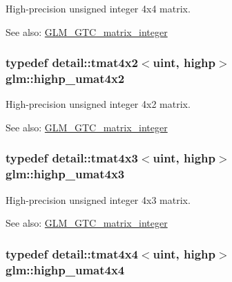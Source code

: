 High-precision unsigned integer 4x4 matrix. \begin{Desc}
\item[See also:]\hyperlink{group__gtc__matrix__integer}{GLM\_\-GTC\_\-matrix\_\-integer} \end{Desc}
\hypertarget{group__gtc__matrix__integer_g32442efcb778cb80024a17bafa781f81}{
\subsubsection[highp\_\-umat4x2]{\setlength{\rightskip}{0pt plus 5cm}typedef detail::tmat4x2$<$uint, highp$>$ {\bf glm::highp\_\-umat4x2}}}
\label{group__gtc__matrix__integer_g32442efcb778cb80024a17bafa781f81}


High-precision unsigned integer 4x2 matrix. \begin{Desc}
\item[See also:]\hyperlink{group__gtc__matrix__integer}{GLM\_\-GTC\_\-matrix\_\-integer} \end{Desc}
\hypertarget{group__gtc__matrix__integer_g763a36c57b6073ca3cac739bfbe794ba}{
\subsubsection[highp\_\-umat4x3]{\setlength{\rightskip}{0pt plus 5cm}typedef detail::tmat4x3$<$uint, highp$>$ {\bf glm::highp\_\-umat4x3}}}
\label{group__gtc__matrix__integer_g763a36c57b6073ca3cac739bfbe794ba}


High-precision unsigned integer 4x3 matrix. \begin{Desc}
\item[See also:]\hyperlink{group__gtc__matrix__integer}{GLM\_\-GTC\_\-matrix\_\-integer} \end{Desc}
\hypertarget{group__gtc__matrix__integer_ga14b7029cfaf6f26384782f5ff7acddf}{
\subsubsection[highp\_\-umat4x4]{\setlength{\rightskip}{0pt plus 5cm}typedef detail::tmat4x4$<$uint, highp$>$ {\bf glm::highp\_\-umat4x4}}}
\label{group__gtc__matrix__integer_ga14b7029cfaf6f26384782f5ff7acddf}


